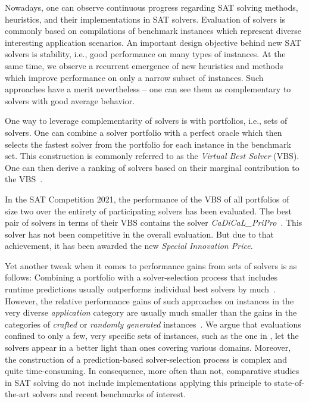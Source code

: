 \documentclass[a4paper,USenglish,pdfa]{lipics-v2021} %
\begin{document}
Nowadays, one can observe continuous progress regarding SAT solving methods, heuristics, and their implementations in SAT solvers. 
Evaluation of solvers is commonly based on compilations of benchmark instances which represent diverse interesting application scenarios. 
An important design objective behind new SAT solvers is stability, i.e., good performance on many types of instances. 
At the same time, we observe a recurrent emergence of new heuristics and methods which improve performance on only a narrow subset of instances. 
Such approaches have a merit nevertheless -- one can see them as complementary to solvers with good average behavior. 

One way to leverage complementarity of solvers is with portfolios, i.e., sets of solvers.
One can combine a solver portfolio with a perfect oracle which then selects the fastest solver from the portfolio for each instance in the benchmark set. 
This construction is commonly referred to as the \emph{Virtual Best Solver} (VBS). 
One can then derive a ranking of solvers based on their marginal contribution to the VBS~\cite{Xu:2012:EvalContribVBS}. 

\begin{example}
\label{ex:specialprice}
In the SAT Competition 2021, the performance of the VBS of all portfolios of size two over the entirety of participating solvers has been evaluated. 
The best pair of solvers in terms of their VBS contains the solver \emph{CaDiCaL\_PriPro}~\cite{balyo2021proceedings}.
This solver has not been competitive in the overall evaluation.
But due to that achievement, it has been awarded the new \emph{Special Innovation Price}.
\end{example}

Yet another tweak when it comes to performance gains from sets of solvers is as follows:
Combining a portfolio with a solver-selection process that includes runtime predictions usually outperforms individual best solvers by much~\cite{xu2008satzilla}. 
However, the relative performance gains of such approaches on instances in the very diverse \emph{application} category are usually much smaller than the gains in the categories of \emph{crafted} or \emph{randomly generated} instances~\cite{Xu:2012:EvalContribVBS,Collautti:2013:SNNAP}. 
We argue that evaluations confined to only a few, very specific sets of instances, such as the one in \cite{Kadioglu:2010:ISAC}, let the solvers appear in a better light than ones covering various domains. 
Moreover, the construction of a prediction-based solver-selection process is complex and quite time-consuming.
In consequence, more often than not, comparative studies in SAT solving do not include implementations applying this principle to state-of-the-art solvers and recent benchmarks of interest.
\end{document}
